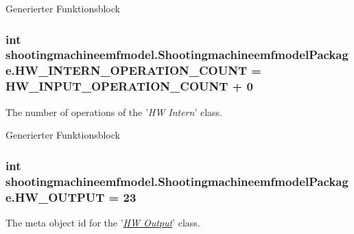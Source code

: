 Generierter Funktionsblock  \hypertarget{interfaceshootingmachineemfmodel_1_1_shootingmachineemfmodel_package_adbbe73334258683c2c965998d0696d81}{
\subsubsection[{H\-W\-\_\-\-I\-N\-T\-E\-R\-N\-\_\-\-O\-P\-E\-R\-A\-T\-I\-O\-N\-\_\-\-C\-O\-U\-N\-T}]{\setlength{\rightskip}{0pt plus 5cm}int shootingmachineemfmodel.\-Shootingmachineemfmodel\-Package.\-H\-W\-\_\-\-I\-N\-T\-E\-R\-N\-\_\-\-O\-P\-E\-R\-A\-T\-I\-O\-N\-\_\-\-C\-O\-U\-N\-T = {\bf H\-W\-\_\-\-I\-N\-P\-U\-T\-\_\-\-O\-P\-E\-R\-A\-T\-I\-O\-N\-\_\-\-C\-O\-U\-N\-T} + 0}}\label{interfaceshootingmachineemfmodel_1_1_shootingmachineemfmodel_package_adbbe73334258683c2c965998d0696d81}
The number of operations of the '{\itshape H\-W Intern}' class.

Generierter Funktionsblock  \hypertarget{interfaceshootingmachineemfmodel_1_1_shootingmachineemfmodel_package_a4bae4f84bd29c449d0339215d739b21b}{
\subsubsection[{H\-W\-\_\-\-O\-U\-T\-P\-U\-T}]{\setlength{\rightskip}{0pt plus 5cm}int shootingmachineemfmodel.\-Shootingmachineemfmodel\-Package.\-H\-W\-\_\-\-O\-U\-T\-P\-U\-T = 23}}\label{interfaceshootingmachineemfmodel_1_1_shootingmachineemfmodel_package_a4bae4f84bd29c449d0339215d739b21b}
The meta object id for the '\hyperlink{classshootingmachineemfmodel_1_1impl_1_1_h_w_output_impl}{{\itshape H\-W Output}}' class.

